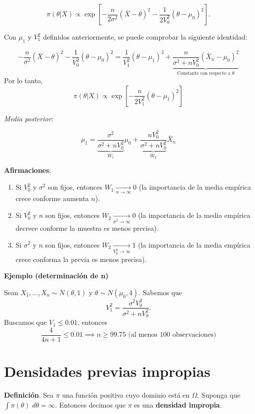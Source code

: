 \documentclass[
  12pt,
]{book}
\begin{document}
\[ \pi(\theta|X) \propto \exp\left[-\dfrac{n}{2\sigma ^2}(\bar X - \theta )^2-\dfrac{1}{2V_0^2}(\theta - \mu_0)^2\right].\]

Con \(\mu_1\) y \(V_1^2\) definidos anteriormente, se puede comprobar la siguiente identidad:

\[-\dfrac{n}{\sigma ^2}(\bar X - \theta )^2-\dfrac{1}{V_0^2}(\theta - \mu_0)^2= \dfrac{1}{V_1^2}(\theta-\mu_1)^2 + \underbrace{\dfrac{n}{\sigma^2 + nV_0^2}(\bar X_n- \mu_0)^2}_{\text{Constante con respecto a }\theta}\]
Por lo tanto, \[\pi(\theta|X) \propto \exp\left[-\dfrac{n}{2V_1^2}(\theta -\mu_1)^2\right]\]

\emph{Media posterior}:

\[\mu_1 = \underbrace{\dfrac{\sigma^2}{\sigma^2 + nV_0^2}}_{W_1}\mu_0 + \underbrace{\dfrac{nV_0^2}{\sigma^2 + nV_0^2}}_{W_2}
\bar X_n \]

\textbf{Afirmaciones}:

\begin{enumerate}
\def\labelenumi{\arabic{enumi})}
\item
  Si \(V_0^2\) y \(\sigma^2\) son fijos, entonces \(W_1 \xrightarrow[n\to \infty]{}0\) (la importancia de la media empírica crece conforme aumenta \(n\)).
\item
  Si \(V_0^2\) y \(n\) son fijos, entonces \(W_2 \xrightarrow[\sigma^2\to \infty]{}0\) (la importancia de la media empírica decrece conforme la muestra es menos precisa).
\item
  Si \(\sigma^2\) y \(n\) son fijos, entonces \(W_2 \xrightarrow[V_0^2\to \infty]{}1\) (la importancia de la media empírica crece conforma la previa es menos precisa).
\end{enumerate}

\textbf{Ejemplo (determinación de n)}

Sean \(X_1,\dots, X_n \sim N(\theta,1)\) y \(\theta\sim N(\mu_0,4)\). Sabemos que \[V_1^2 = \dfrac{\sigma^2V_0^2}{\sigma^2 + nV_0^2}. \]
Buscamos que \(V_1\leq 0.01\), entonces
\[ \dfrac{4}{4n+1}\leq 0.01 \implies n\geq 99.75 \text{ (al menos 100 observaciones)}\]

\hypertarget{densidades-previas-impropias}{%
\section{Densidades previas impropias}\label{densidades-previas-impropias}}

\textbf{Definición}. Sea \(\pi\) una función positiva cuyo dominio está en \(\Omega\). Suponga que \(\int\pi(\theta)\;d\theta = \infty\). Entonces decimos que \(\pi\) es una \textbf{densidad impropia}.
\end{document}

